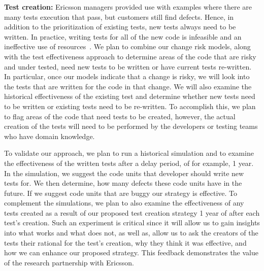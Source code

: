 \textbf{Test creation:} Ericsson managers provided use with examples where there are many tests execution that pass, but customers still find defects. Hence, in addition to the prioritization of existing tests, new tests always need to be written. In practice, writing tests for all of the new code is infeasible and an ineffective use of resources~\cite{Mockus2009ESEM}. We plan to combine our change risk models, along with the test effectiveness approach to determine areas of the code that are risky and under tested, \ie need new tests to be written or have current tests re-written. In particular, once our models indicate that a change is risky, we will look into the tests that are written for the code in that change. We will also examine the historical effectiveness of the existing test and determine whether new tests need to be written or existing tests need to be re-written. To accomplish this, we plan to flag areas of the code that need tests to be created, however, the actual creation of the tests will need to be performed by the developers or testing teams who have domain knowledge.

To validate our approach, we plan to run a historical simulation and to examine the effectiveness of the written tests after a delay period, of for example, 1 year. In the simulation, we suggest the code units that developer should write new tests for. We then determine, how many defects these code units have in the future. If we suggest code units that are buggy our strategy is effective. To complement the simulations, we plan to also examine the effectiveness of any tests created as a result of our proposed test creation strategy 1 year of after each test's creation. Such an experiment is critical since it will allow us to gain insights into what works and what does not, as well as, allow us to ask the creators of the tests their rational for the test's creation, why they think it was effective, and how we can enhance our proposed strategy. This feedback demonstrates the value of the research partnership with Ericsson. 



